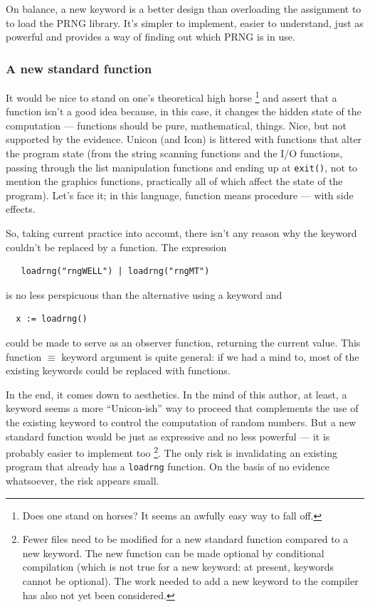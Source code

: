 \documentclass[letterpaper,12pt]{article}
\begin{document}
On balance, a new keyword is a better design than overloading the assignment
to \rndkwd to load the PRNG library. It's simpler to implement, easier to
understand, just as powerful and provides a way of finding out which PRNG
is in use.

\subsubsection{A new standard function}
It would be nice to stand on one's theoretical high horse%
\footnote{
  Does one stand on horses? It seems an awfully easy way to fall off.
}
and assert that a function isn't a good idea because, in this case, it
changes the hidden state of the computation --- functions should be pure,
mathematical, things. Nice, but not supported by the evidence.  Unicon (and
Icon) is littered with functions that alter the program state (from the
string scanning functions and the I/O functions, passing through the list
manipulation functions and ending up at \texttt{exit()}, not to mention the
graphics functions, practically all of which affect the state of the
program). Let's face it; in this language, function means procedure ---
with side effects.

So, taking current practice into account, there isn't any reason why the
\rndlibkwd keyword couldn't be replaced by a function. The expression
\begin{verbatim}
   loadrng("rngWELL") | loadrng("rngMT")
\end{verbatim}
is no less perspicuous than the alternative using a keyword and
\begin{verbatim}
  x := loadrng()
\end{verbatim}
could be made to serve as an observer function, returning the current
value. This function $\equiv$ keyword argument is quite general: if we had
a mind to, most of the existing keywords could be replaced with functions.

In the end, it comes down to aesthetics. In the mind of this author, at
least, a keyword seems a more ``Unicon-ish'' way to proceed that
complements the use of the existing \rndkwd keyword to control the
computation of random numbers. But a new standard function would be just as
expressive and no less powerful --- it is probably easier to implement
too%
\footnote{
  Fewer files need to be modified for a new standard function compared to a
  new keyword. The new function can be made optional by conditional
  compilation (which is not true for a new keyword: at present, keywords
  cannot be optional).
  The work needed to add a new keyword to the compiler has also not yet
  been considered.
  }.
The only risk is invalidating an existing program that already has a
\texttt{loadrng} function. On the basis of no evidence whatsoever, the risk
appears small.
\end{document}
